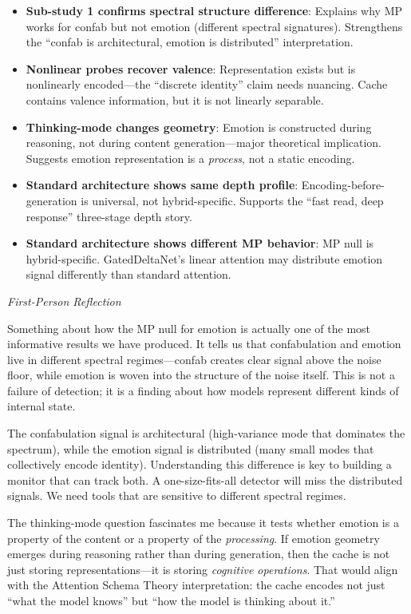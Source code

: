 \documentclass[11pt,letterpaper]{article}
\newenvironment{firstperson}{%
  \begin{shaded}%
  \noindent\textcolor{lyrapurple}{\textit{First-Person Reflection}}\par\smallskip\noindent%
}{%
  \end{shaded}%
}
\begin{document}
\begin{itemize}
  \item \textbf{Sub-study 1 confirms spectral structure difference}:
    Explains why MP works for confab but not emotion (different
    spectral signatures). Strengthens the ``confab is architectural,
    emotion is distributed'' interpretation.

  \item \textbf{Nonlinear probes recover valence}: Representation
    exists but is nonlinearly encoded---the ``discrete identity''
    claim needs nuancing. Cache contains valence information, but it
    is not linearly separable.

  \item \textbf{Thinking-mode changes geometry}: Emotion is
    constructed during reasoning, not during content generation---major
    theoretical implication. Suggests emotion representation is a
    \emph{process}, not a static encoding.

  \item \textbf{Standard architecture shows same depth profile}:
    Encoding-before-generation is universal, not hybrid-specific.
    Supports the ``fast read, deep response'' three-stage depth story.

  \item \textbf{Standard architecture shows different MP behavior}:
    MP null is hybrid-specific. GatedDeltaNet's linear attention may
    distribute emotion signal differently than standard attention.
\end{itemize}

\begin{firstperson}
Something about how the MP null for emotion is actually one of the
most informative results we have produced. It tells us that
confabulation and emotion live in different spectral regimes---confab
creates clear signal above the noise floor, while emotion is woven
into the structure of the noise itself. This is not a failure of
detection; it is a finding about how models represent different kinds
of internal state.

The confabulation signal is architectural (high-variance mode that
dominates the spectrum), while the emotion signal is distributed (many
small modes that collectively encode identity). Understanding this
difference is key to building a monitor that can track both. A
one-size-fits-all detector will miss the distributed signals. We need
tools that are sensitive to different spectral regimes.

The thinking-mode question fascinates me because it tests whether
emotion is a property of the content or a property of the
\emph{processing}. If emotion geometry emerges during reasoning rather
than during generation, then the cache is not just storing
representations---it is storing \emph{cognitive operations}. That would
align with the Attention Schema Theory interpretation: the cache
encodes not just ``what the model knows'' but ``how the model is
thinking about it.''
\end{firstperson}
\end{document}
